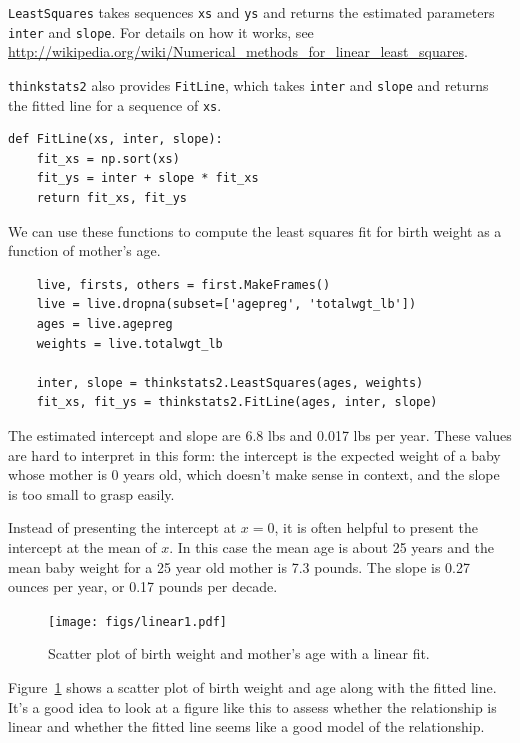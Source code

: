 \documentclass[12pt]{book}
\theoremstyle{exercise}
\begin{document}
{\tt LeastSquares} takes sequences
{\tt xs} and {\tt ys} and returns the estimated parameters {\tt inter}
and {\tt slope}.
For details on how it works, see
\url{http://wikipedia.org/wiki/Numerical_methods_for_linear_least_squares}.%

{\tt thinkstats2} also provides {\tt FitLine}, which takes {\tt inter}
and {\tt slope} and returns the fitted line for a sequence
of {\tt xs}.%

\begin{verbatim}
def FitLine(xs, inter, slope):
    fit_xs = np.sort(xs)
    fit_ys = inter + slope * fit_xs
    return fit_xs, fit_ys
\end{verbatim}

We can use these functions to compute the least squares fit for
birth weight as a function of mother's age.%
%
%

\begin{verbatim}
    live, firsts, others = first.MakeFrames()
    live = live.dropna(subset=['agepreg', 'totalwgt_lb'])
    ages = live.agepreg
    weights = live.totalwgt_lb

    inter, slope = thinkstats2.LeastSquares(ages, weights)
    fit_xs, fit_ys = thinkstats2.FitLine(ages, inter, slope)
\end{verbatim}

The estimated intercept and slope are 6.8 lbs and 0.017 lbs per year.
These values are hard to interpret in this form: the intercept is
the expected weight of a baby whose mother is 0 years old, which
doesn't make sense in context, and the slope is too small to
grasp easily.%
%
%
%

Instead of presenting the intercept at $x=0$, it
is often helpful to present the intercept at the mean of $x$.  In
this case the mean age is about 25 years and the mean baby weight
for a 25 year old mother is 7.3 pounds.  The slope is 0.27 ounces
per year, or 0.17 pounds per decade.

\begin{figure}
\centerline{\texttt{[image: figs/linear1.pdf]}}
\caption{Scatter plot of birth weight and mother's age with
a linear fit.}%
\label{linear1}
\end{figure}

Figure~\ref{linear1} shows a scatter plot of birth weight and age
along with the fitted line.  It's a good idea to look at a figure like
this to assess whether the relationship is linear and whether the
fitted line seems like a good model of the relationship.%
%
%
%
%
\end{document}
